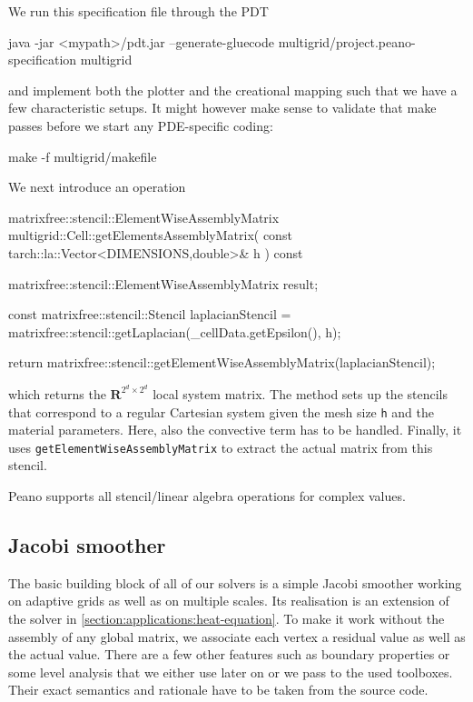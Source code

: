 \noindent
We run this specification file through the PDT

\begin{code}
java -jar <mypath>/pdt.jar --generate-gluecode multigrid/project.peano-specification multigrid
\end{code}


\noindent
and implement both the plotter and the creational mapping such that we have a
few characteristic setups. 
It might however make sense to validate that make passes before we start any
PDE-specific coding:
\begin{code}
make -f multigrid/makefile
\end{code}


\noindent
We next introduce an operation 
\begin{code}
matrixfree::stencil::ElementWiseAssemblyMatrix multigrid::Cell::getElementsAssemblyMatrix(
  const tarch::la::Vector<DIMENSIONS,double>&  h
) const {
  matrixfree::stencil::ElementWiseAssemblyMatrix result;

  const matrixfree::stencil::Stencil laplacianStencil = 
    matrixfree::stencil::getLaplacian(_cellData.getEpsilon(), h);

  return matrixfree::stencil::getElementWiseAssemblyMatrix(laplacianStencil);
}
\end{code}
which returns the $\mathbf{R}^{2^d \times 2^d}$ local system matrix. 
The method sets up the stencils that correspond to a regular Cartesian system
given the mesh size \texttt{h} and the material parameters.
Here, also the convective term has to be handled.
Finally, it uses \texttt{getElementWiseAssemblyMatrix} to extract the actual
matrix from this stencil.

\begin{remark}
  Peano supports all stencil/linear algebra operations for complex values.
\end{remark}


\subsection{Jacobi smoother}

The basic building block of all of our solvers is a simple Jacobi smoother
working on adaptive grids as well as on multiple scales.
Its realisation is an extension of the solver in \ref{section:applications:heat-equation}.
To make it work without the assembly of any global matrix, we associate each
vertex a residual value as well as the actual value. 
There are a few other features such as boundary properties or some level
analysis that we either use later on or we pass to the used toolboxes. 
Their exact semantics and rationale have to be taken from the source code.

